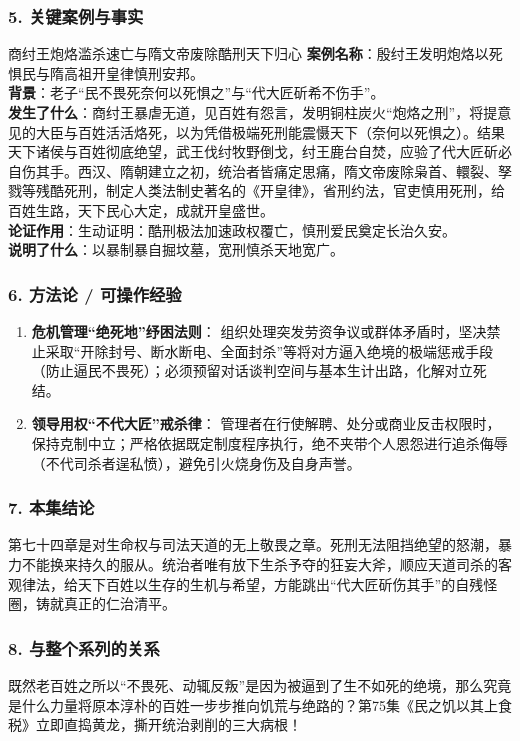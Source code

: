 \subsubsection{5. 关键案例与事实}
\begin{CaseBox}{商纣王炮烙滥杀速亡与隋文帝废除酷刑天下归心}
\textbf{案例名称}：殷纣王发明炮烙以死惧民与隋高祖开皇律慎刑安邦。\\
\textbf{背景}：老子“民不畏死奈何以死惧之”与“代大匠斫希不伤手”。\\
\textbf{发生了什么}：商纣王暴虐无道，见百姓有怨言，发明铜柱炭火“炮烙之刑”，将提意见的大臣与百姓活活烙死，以为凭借极端死刑能震慑天下（奈何以死惧之）。结果天下诸侯与百姓彻底绝望，武王伐纣牧野倒戈，纣王鹿台自焚，应验了代大匠斫必自伤其手。西汉、隋朝建立之初，统治者皆痛定思痛，隋文帝废除枭首、轘裂、孥戮等残酷死刑，制定人类法制史著名的《开皇律》，省刑约法，官吏慎用死刑，给百姓生路，天下民心大定，成就开皇盛世。\\
\textbf{论证作用}：生动证明：酷刑极法加速政权覆亡，慎刑爱民奠定长治久安。\\
\textbf{说明了什么}：以暴制暴自掘坟墓，宽刑慎杀天地宽广。
\end{CaseBox}

\subsubsection{6. 方法论 / 可操作经验}
\begin{enumerate}
    \item \textbf{危机管理“绝死地”纾困法则}：
    组织处理突发劳资争议或群体矛盾时，坚决禁止采取“开除封号、断水断电、全面封杀”等将对方逼入绝境的极端惩戒手段（防止逼民不畏死）；必须预留对话谈判空间与基本生计出路，化解对立死结。
    \item \textbf{领导用权“不代大匠”戒杀律}：
    管理者在行使解聘、处分或商业反击权限时，保持克制中立；严格依据既定制度程序执行，绝不夹带个人恩怨进行追杀侮辱（不代司杀者逞私愤），避免引火烧身伤及自身声誉。
\end{enumerate}

\subsubsection{7. 本集结论}
第七十四章是对生命权与司法天道的无上敬畏之章。死刑无法阻挡绝望的怒潮，暴力不能换来持久的服从。统治者唯有放下生杀予夺的狂妄大斧，顺应天道司杀的客观律法，给天下百姓以生存的生机与希望，方能跳出“代大匠斫伤其手”的自残怪圈，铸就真正的仁治清平。

\subsubsection{8. 与整个系列的关系}
既然老百姓之所以“不畏死、动辄反叛”是因为被逼到了生不如死的绝境，那么究竟是什么力量将原本淳朴的百姓一步步推向饥荒与绝路的？第75集《民之饥以其上食税》立即直捣黄龙，撕开统治剥削的三大病根！

